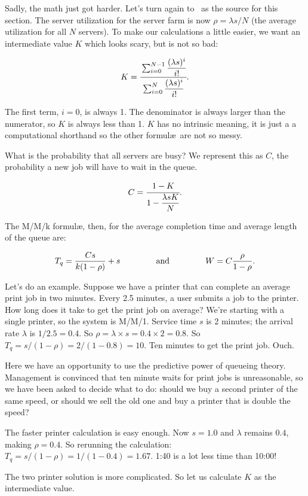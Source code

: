 \documentclass[a4paper]{report}
\begin{document}
Sadly, the math just got harder. Let's turn again to~\cite{williams-q} as the source for this section. The server utilization for the server farm is now $\rho = \lambda s / N$ (the average utilization for all $N$ servers). To make our calculations a little easier, we want an intermediate value $K$ which looks scary, but is not so bad:

\[ K = \cfrac{\sum_{i=0}^{N-1}\dfrac{(\lambda s)^{i}}{i!}}{{\sum_{i=0}^{N}\dfrac{(\lambda s)^{i}}{i!}}}.
\]

The first term, $i = 0$, is always 1. The denominator is always larger than the numerator, so $K$ is always less than 1. $K$ has no intrinsic meaning, it is just a a computational shorthand so the other formul\ae\  are not so messy.

What is the probability that all servers are busy? We represent this as $C$, the probability a new job will have to wait in the queue.

\[C = \cfrac{1 - K}{1 - \dfrac{\lambda s K}{N}}.\]

The M/M/k formul\ae, then, for the average completion time and average length of the queue are:

\[
  T_{q} = \dfrac{C s}{k(1 - \rho)} + s \mbox{ \qquad\qquad and \qquad\qquad } W = C \dfrac{\rho}{1 - \rho}.
\]

Let's do an example. Suppose we have a printer that can complete an average print job in two minutes. Every 2.5 minutes, a user submits a job to the printer. How long does it take to get the print job on average? We're starting with a single printer, so the system is M/M/1. Service time $s$ is 2 minutes; the arrival rate $\lambda$ is $1/2.5 = 0.4$. So $\rho = \lambda \times s = 0.4 \times 2 = 0.8$. So $T_{q} = s / (1 - \rho ) = 2 / (1 -0.8 ) = 10$. Ten minutes to get the print job. Ouch.

Here we have an opportunity to use the predictive power of queueing theory. Management is convinced that ten minute waits for print jobs is unreasonable, so we have been asked to decide what to do: should we buy a second printer of the same speed, or should we sell the old one and buy a printer that is double the speed?

The faster printer calculation is easy enough. Now $s = 1.0$ and $\lambda$ remains $0.4$, making $\rho = 0.4$. So rerunning the calculation: $T_{q} = s / (1 - \rho ) = 1 / (1 - 0.4 ) = 1.67$. 1:40 is a lot less time than 10:00! 

The two printer solution is more complicated. So let us calculate $K$ as the intermediate value. 
\end{document}
